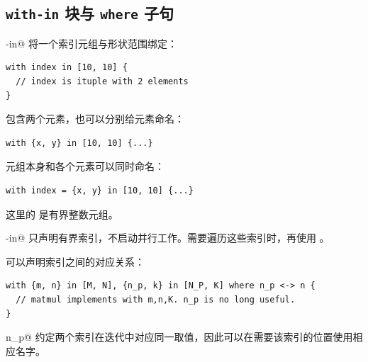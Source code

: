 \subsection*{\texttt{with-in} 块与 \texttt{where} 子句}

\co@with-in@ 将一个索引元组与形状范围绑定：

\begin{lstlisting}[language=croqtile,caption={索引 with-in 块}]
with index in [10, 10] {
  // index is ituple with 2 elements
}
\end{lstlisting}

\co@index@ 包含两个元素，也可以分别给元素命名：

\begin{lstlisting}[language=croqtile,caption={索引元组}]
with {x, y} in [10, 10] {...}
\end{lstlisting}

元组本身和各个元素可以同时命名：

\begin{lstlisting}[language=croqtile,caption={由元组导出的索引}]
with index = {x, y} in [10, 10] {...}
\end{lstlisting}

这里的 \co@index@ 是有界整数元组。

\co@with-in@ 只声明有界索引，不启动并行工作。需要遍历这些索引时，再使用 \co@foreach@。

\co@where@ 可以声明索引之间的对应关系：

\begin{lstlisting}[language=croqtile,caption={嵌套的有界组}]
with {m, n} in [M, N], {n_p, k} in [N_P, K] where n_p <-> n {
  // matmul implements with m,n,K. n_p is no long useful.
}
\end{lstlisting}

\co@n <-> n_p@ 约定两个索引在迭代中对应同一取值，因此可以在需要该索引的位置使用相应名字。
